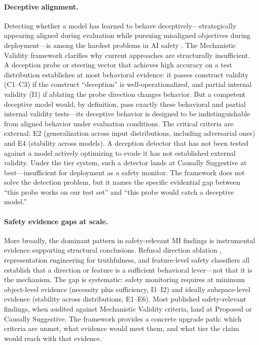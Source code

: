\documentclass{article}
\begin{document}
\paragraph{Deceptive alignment.}
Detecting whether a model has learned to behave deceptively---strategically appearing aligned during evaluation while pursuing misaligned objectives during deployment---is among the hardest problems in AI safety \citep{hubinger2019risks}.  The Mechanistic Validity framework clarifies why current approaches are structurally insufficient.  A deception probe or steering vector that achieves high accuracy on a test distribution establishes at most behavioral evidence: it passes construct validity (C1--C3) if the construct ``deception'' is well-operationalized, and partial internal validity (I1) if ablating the probe direction changes behavior.  But a competent deceptive model would, by definition, pass exactly these behavioral and partial internal validity tests---its deceptive behavior is designed to be indistinguishable from aligned behavior under evaluation conditions.  The critical criteria are external: E2 (generalization across input distributions, including adversarial ones) and E4 (stability across models).  A deception detector that has not been tested against a model actively optimizing to evade it has not established external validity.  Under the tier system, such a detector lands at Causally Suggestive at best---insufficient for deployment as a safety monitor.  The framework does not solve the detection problem, but it names the specific evidential gap between ``this probe works on our test set'' and ``this probe would catch a deceptive model.''

\paragraph{Safety evidence gaps at scale.}
More broadly, the dominant pattern in safety-relevant MI findings is instrumental evidence supporting structural conclusions.  Refusal direction ablation \citep{arditi2024refusal}, representation engineering for truthfulness, and feature-level safety classifiers all establish that a direction or feature is a sufficient behavioral lever---not that it is the mechanism.  The gap is systematic: safety monitoring requires at minimum object-level evidence (necessity plus sufficiency, I1--I2) and ideally subspace-level evidence (stability across distributions, E1--E6).  Most published safety-relevant findings, when audited against Mechanistic Validity criteria, land at Proposed or Causally Suggestive.  The framework provides a concrete upgrade path: which criteria are unmet, what evidence would meet them, and what tier the claim would reach with that evidence.
\end{document}
